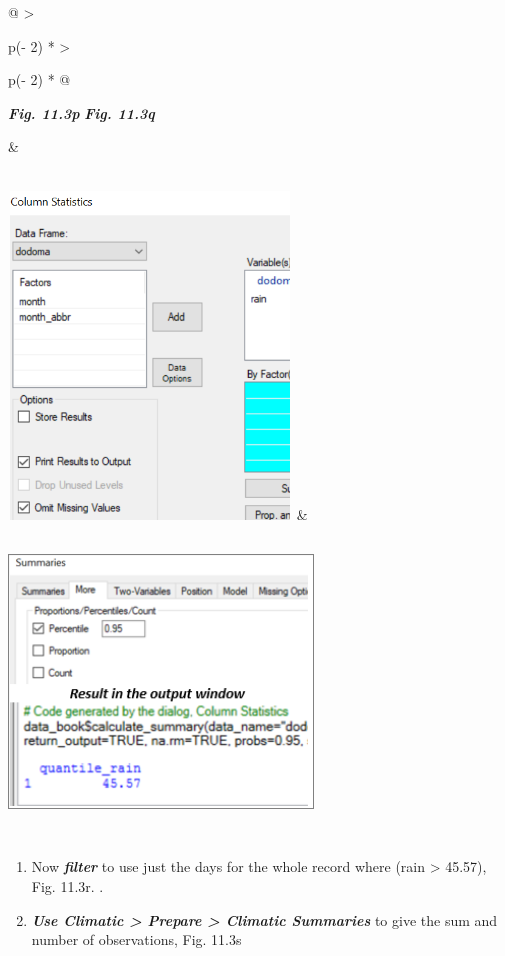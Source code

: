 \documentclass[
  letterpaper,
  DIV=11,
  numbers=noendperiod]{scrreprt}
\begin{document}
\begin{longtable}[]{@{}
  >{\raggedright\arraybackslash}p{(\columnwidth - 2\tabcolsep) * }
  >{\raggedright\arraybackslash}p{(\columnwidth - 2\tabcolsep) * }@{}}
\toprule\noalign{}
\begin{minipage}[b]{\linewidth}\raggedright
\textbf{\emph{Fig. 11.3p}} \textbf{\emph{Fig. 11.3q}}
\end{minipage} & \begin{minipage}[b]{\linewidth}\raggedright
\end{minipage} \\
\midrule\noalign{}
\endhead
\bottomrule\noalign{}
\endlastfoot
\includegraphics[width=2.96in,height=3.43011in]{figures/Fig11.3p.png} &
\includegraphics[width=3.18575in,height=3.27396in]{figures/Fig11.3q.png} \\
\end{longtable}

\begin{enumerate}
\def\labelenumi{\arabic{enumi}.}
\setcounter{enumi}{2}
\item
  Now \textbf{\emph{filter}} to use just the days for the whole record
  where (rain \textgreater{} 45.57), Fig. 11.3r. .
\item
  \textbf{\emph{Use Climatic \textgreater{} Prepare \textgreater{}
  Climatic Summaries}} to give the sum and number of observations, Fig.
  11.3s
\end{enumerate}
\end{document}
